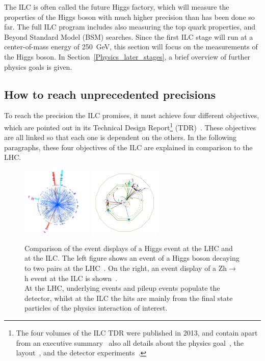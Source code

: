 The ILC is often called the future Higgs factory, which will measure the properties of the Higgs boson with much higher precision than has been done so far.
The full ILC program includes also measuring the top quark properties, and Beyond Standard Model (BSM) searches.
Since the first ILC stage will run at a center-of-mass energy of \SI{250}{\GeV}, this section will focus on the measurements of the Higgs boson.
In Section~\ref{Physics_later_stages}, a brief overview of further physics goals is given.
 
\subsection{How to reach unprecedented precisions}
\label{Physics_Motivation}
To reach the precision the ILC promises, it must achieve four different objectives, which are pointed out in its Technical Design Report\footnote{The four volumes of the ILC TDR were published in 2013, and contain apart from an executive summary~\cite{TDR1} also all details about the physics goal~\cite{TDR2}, the layout~\cite{TDR31,TDR32}, and the detector experiments~\cite{TDR4}.} (TDR)~\cite[p. 2ff]{TDR2}. 
These objectives are all linked so that each one is dependent on the others.
In the following paragraphs, these four objectives of the ILC are explained in comparison to the LHC.

\begin{figure}[!h]
\centering
\includegraphics[width=0.3\textwidth]{Figures/ATLAS_event_display.png}
\includegraphics[width=0.3\textwidth]{Figures/ILD_event_display.png}
\caption[Higgs event displays at LHC and ILC]{Comparison of the event displays of a Higgs event at the  LHC and at the ILC.
The left figure shows an event of a Higgs boson decaying to two \positron\electron pairs at the LHC~\cite{ATLAS_event_display}.
On the right, an event display of a Zh$\rightarrow$\positron\electron h event at the ILC is shown~\cite{ILD_event_display}.
\\At the LHC, underlying events and pileup events populate the detector, whilst at the ILC the hits are mainly from the final state particles of the physics interaction of interest.
}
\label{fig:Cleanliness}
\end{figure}


